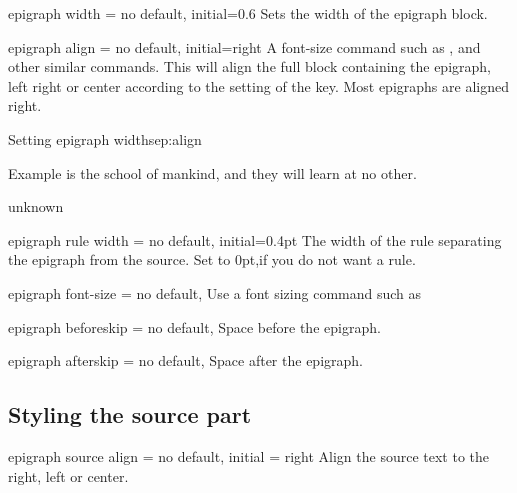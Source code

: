 \begin{docKey}[phd]{epigraph width}{ =  }{no default, initial=0.6}
  Sets the width of the epigraph block. 
\end{docKey}



\begin{docKey}[phd]{epigraph align}{ = }{no default, initial=right}
 A font-size command such as , 
 and other similar commands. This will align the full block containing the epigraph, left right or center according to the setting of the key. Most epigraphs are aligned right.
\end{docKey}

\begin{texexample}{Setting epigraph widths}{ep:align}
 \epigraph{Example is the school of mankind, and they
   will learn at no other.}{unknown}
\end{texexample}

\begin{docKey}[phd]{epigraph rule width}{ = } {no default, initial=0.4pt }
 The width of the rule separating the epigraph from the source. Set to 0pt,if you do not want a rule.
\end{docKey}



\begin{docKey}[phd]{ epigraph font-size}{ = } {no default,}
Use a font sizing command such as \cmd{\footnotesize}
\end{docKey}

\begin{docKey}[phd]{ epigraph beforeskip}{ = }{no default, }
Space before the epigraph.
\end{docKey}

\begin{docKey}[phd]{ epigraph afterskip}{ = }{no default, }
Space after the epigraph.
\end{docKey}

\subsection{Styling the source part}

\begin{docKey}[phd]{ epigraph source align}{ = }{no default, initial = right}
Align the source text to the right, left or center.
\end{docKey}

